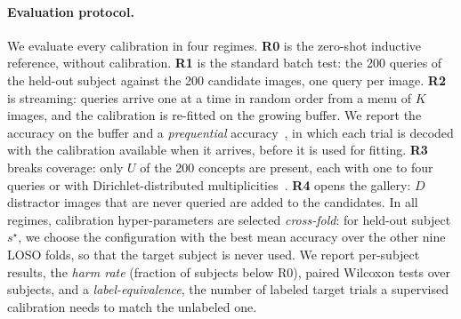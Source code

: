 \documentclass[10pt,twocolumn,letterpaper]{article}
\begin{document}
\paragraph{Evaluation protocol.}
We evaluate every calibration in four regimes. \textbf{R0} is the zero-shot inductive reference, without calibration. \textbf{R1} is the standard batch test: the 200 queries of the held-out subject against the 200 candidate images, one query per image. \textbf{R2} is streaming: queries arrive one at a time in random order from a menu of $K$ images, and the calibration is re-fitted on the growing buffer. We report the accuracy on the buffer and a \emph{prequential} accuracy~\cite{dawid1984prequential}, in which each trial is decoded with the calibration available when it arrives, before it is used for fitting. \textbf{R3} breaks coverage: only $U$ of the 200 concepts are present, each with one to four queries or with Dirichlet-distributed multiplicities~\cite{veilleux2021realistic}. \textbf{R4} opens the gallery: $D$ distractor images that are never queried are added to the candidates. In all regimes, calibration hyper-parameters are selected \emph{cross-fold}: for held-out subject $s^\star$, we choose the configuration with the best mean accuracy over the other nine LOSO folds, so that the target subject is never used. We report per-subject results, the \emph{harm rate} (fraction of subjects below R0), paired Wilcoxon tests over subjects, and a \emph{label-equivalence}, the number of labeled target trials a supervised calibration needs to match the unlabeled one.
\end{document}

